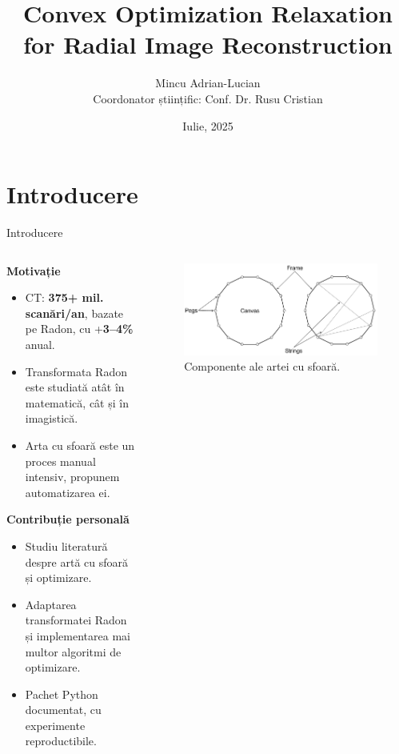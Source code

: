\documentclass[aspectratio=169,xcolor=dvipsnames]{beamer}
\title{Convex Optimization Relaxation for Radial Image Reconstruction}
\author{
    Mincu Adrian-Lucian\\
    \small Coordonator științific: Conf. Dr. Rusu Cristian
}
\institute
{
    Universitatea din București - Facultatea de Matematică și Informatică
}
\date{Iulie, 2025} %
\begin{document}
\begin{frame}
    \titlepage
\end{frame}

\section{Introducere}

\begin{frame}{Introducere}
    \begin{columns}
        \begin{column}{0.6\textwidth}
            \textbf{Motivație}
            \begin{itemize}
                \item CT: \textbf{375+ mil. scanări/an}, bazate pe Radon, cu +\textbf{3–4\%} anual.
                \item Transformata Radon este studiată atât în matematică, cât și în imagistică.
                \item Arta cu sfoară este un proces manual intensiv, propunem automatizarea ei.
            \end{itemize}

            \vspace{0.25cm}

            \textbf{Contribuție personală}
            \begin{itemize}
                \item Studiu literatură despre artă cu sfoară și optimizare.
                \item Adaptarea transformatei Radon și implementarea mai multor algoritmi de optimizare.
                \item Pachet Python documentat, cu experimente reproductibile.
            \end{itemize}
        \end{column}

        \begin{column}{0.4\textwidth}
            \begin{figure}
                \includegraphics[width=\linewidth]{images/stringart_components.pdf}
                \caption{Componente ale artei cu sfoară.}
            \end{figure}
        \end{column}
    \end{columns}
\end{frame}
\end{document}
